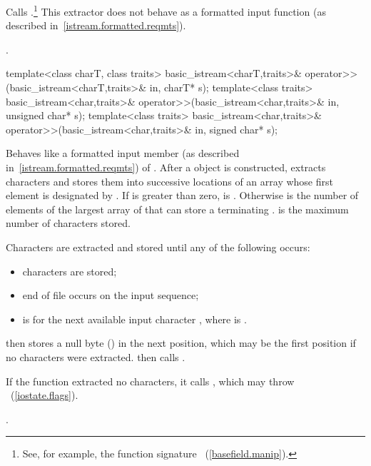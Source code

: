 \begin{itemdescr}
\pnum
\effects
Calls
.\footnote{See, for example, the function signature
~(\ref{basefield.manip}).}
This extractor does not behave as a formatted input function
(as described in~\ref{istream.formatted.reqmts}).

\pnum
\returns
{}.
\end{itemdescr}

%
\begin{itemdecl}
template<class charT, class traits>
  basic_istream<charT,traits>& operator>>(basic_istream<charT,traits>& in,
                                          charT* s);
template<class traits>
  basic_istream<char,traits>& operator>>(basic_istream<char,traits>& in,
                                         unsigned char* s);
template<class traits>
  basic_istream<char,traits>& operator>>(basic_istream<char,traits>& in,
                                         signed char* s);
\end{itemdecl}

\begin{itemdescr}
\pnum
\effects
Behaves like a formatted input member (as described in~\ref{istream.formatted.reqmts})
of .
After a
object is constructed,
extracts characters and stores them into
successive locations of an array whose first element is designated by
.
If
is greater than zero,  is
.
Otherwise  is the number of elements
of the largest array of
that can store a terminating
.
 is the maximum number of characters stored.

\pnum
Characters are extracted and stored until any of the following occurs:
\begin{itemize}
\item
{}
characters are stored;
\item
end of file occurs on the input sequence;
\item
{}
is
for the next available input character ,
where  is
.
\end{itemize}

\pnum
{}
then stores a null byte
()
in the next position, which may be the first position if no characters
were extracted.
then calls
.

\pnum
If the function extracted no characters, it calls
,
which may throw
~(\ref{iostate.flags}).

\pnum
\returns
{}.
\end{itemdescr}

